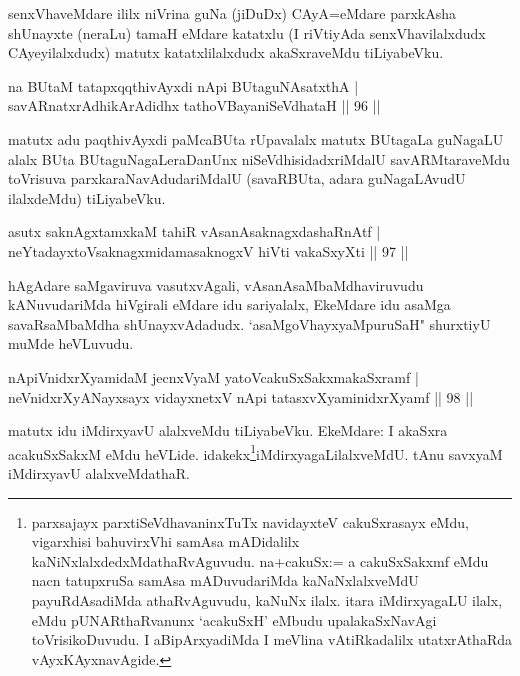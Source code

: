 \begin{artha}
senxVhaveMdare ililx niVrina guNa (jiDuDx) CAyA=eMdare parxkAsha shUnayxte (neraLu) tamaH eMdare katatxlu (I riVtiyAda senxVhavilalxdudx CAyeyilalxdudx) matutx katatxlilalxdudx akaSxraveMdu tiLiyabeVku.
\end{artha}

\begin{shl}
na BUtaM tatapxqqthivAyxdi nApi BUtaguNAsatxthA |\\
savARnatxrAdhikArAdidhx tathoVBayaniSeVdhataH \hfill || 96 ||
\end{shl}

\begin{artha}%
matutx adu paqthivAyxdi paMcaBUta rUpavalalx matutx BUtagaLa guNagaLU alalx BUta BUtaguNagaLeraDanUnx niSeVdhisidadxriMdalU savARMtaraveMdu toVrisuva parxkaraNavAdudariMdalU (savaRBUta, adara guNagaLAvudU ilalxdeMdu) tiLiyabeVku.
\end{artha}

\begin{shl}
asutx saknAgxtamxkaM tahiR vAsanAsaknagxdashaRnAtf |\\
neYtadayxtoV\s saknagxmidamasaknogxV hiVti vakaSxyXti \hfill || 97 ||
\end{shl}

\begin{artha}
hAgAdare saMgaviruva vasutxvAgali, vAsanAsaMbaMdhaviruvudu kANuvuda\-riMda hiVgirali eMdare idu sariyalalx, EkeMdare idu asaMga savaRsaMbaMdha shUnayxvAdadudx. `asaMgoVhayxyaMpuruSaH" shurxtiyU muMde heVLuvudu.
\end{artha}

\begin{shl}
nApiVnidxrXyamidaM jecnxVyaM yatoV\s cakuSxSakxmakaSxramf |\\
neVnidxrXyANayxsayx vidayxnetxV nApi tatasxvXyaminidxrXyamf \hfill || 98 ||
\end{shl}

\begin{artha}
matutx idu iMdirxyavU alalxveMdu tiLiyabeVku. EkeMdare: I akaSxra acakuSxSakxM eMdu heVLide. idakekx\footnote[1]{parxsajayx parxtiSeVdhavaninxTuTx navidayxteV cakuSxrasayx eMdu, vigarxhisi bahuvirxVhi samAsa mADidalilx kaNiNxlalx\-dedxMdathaRvAguvudu. na+cakuSx:= a cakuSxSakxmf eMdu nacn tatupxruSa samAsa mADuvu\-dariMda kaNaNxlalxveMdU payuRdAsadiMda athaRvAguvudu, kaNuNx ilalx. itara iMdirxyagaLU ilalx, eMdu pUNARthaRvanunx `acakuSxH' eMbudu upalakaSxNavAgi toVrisikoDuvudu. I aBipArxyadiMda I meVlina vAtiRkadalilx utatxrAthaRda vAyxKAyxnavAgide.}iMdirxyagaLilalxveMdU. tAnu savxyaM iMdirxyavU alalxveMdathaR.
\end{artha}

